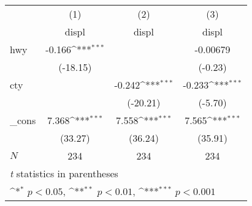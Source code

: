 {
\def\sym#1{\ifmmode^{#1}\else\(^{#1}\)\fi}
\begin{tabular}{l*{3}{c}}
\hline\hline
            &\multicolumn{1}{c}{(1)}&\multicolumn{1}{c}{(2)}&\multicolumn{1}{c}{(3)}\\
            &\multicolumn{1}{c}{displ}&\multicolumn{1}{c}{displ}&\multicolumn{1}{c}{displ}\\
\hline
hwy         &      -0.166\sym{***}&                     &    -0.00679         \\
            &    (-18.15)         &                     &     (-0.23)         \\
[1em]
cty         &                     &      -0.242\sym{***}&      -0.233\sym{***}\\
            &                     &    (-20.21)         &     (-5.70)         \\
[1em]
\_cons      &       7.368\sym{***}&       7.558\sym{***}&       7.565\sym{***}\\
            &     (33.27)         &     (36.24)         &     (35.91)         \\
\hline
\(N\)       &         234         &         234         &         234         \\
\hline\hline
\multicolumn{4}{l}{\footnotesize \textit{t} statistics in parentheses}\\
\multicolumn{4}{l}{\footnotesize \sym{*} \(p<0.05\), \sym{**} \(p<0.01\), \sym{***} \(p<0.001\)}\\
\end{tabular}
}

